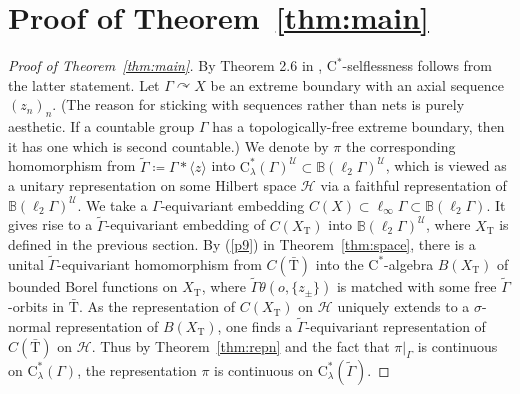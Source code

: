 \documentclass[12pt,nosumlimits,nonamelimits]{amsart}
\theoremstyle{remark}
\theoremstyle{definition}
\newcommand{\IB}{\mathbb{B}}
\newcommand{\cH}{\mathcal{H}}
\newcommand{\cU}{\mathcal{U}}
\newcommand{\Ga}{\Gamma}
\newcommand{\Tree}{\mathrm{T}}
\newcommand{\acts}{\curvearrowright}
\newcommand{\ip}[1]{\mathopen{\langle}#1\mathclose{\rangle}}
\begin{document}
%
\section{Proof of Theorem~\ref{thm:main}}
%
\begin{proof}[Proof of Theorem~\ref{thm:main}]
By Theorem 2.6 in \cite{robert}, $\mathrm{C}^*$-selflessness 
follows from the latter statement. 
Let $\Ga\acts X$ be an extreme boundary 
with an axial sequence $(z_n)_n$. 
(The reason for sticking with sequences 
rather than nets is purely aesthetic. 
If a countable group $\Ga$ has a topologically-free 
extreme boundary, then it has one which is second countable.)
%
%
We denote by $\pi$ the corresponding homomorphism 
from $\tilde{\Ga} \coloneq \Ga*\ip{z}$ into 
$\mathrm{C}^*_\lambda(\Ga)^\cU \subset \IB(\ell_2\Ga)^\cU$, 
which is viewed as a unitary representation on 
some Hilbert space $\cH$ 
via a faithful representation of $\IB(\ell_2\Ga)^\cU$. 
We take a $\Ga$-equivariant embedding 
$C(X)\subset\ell_\infty\Ga\subset\IB(\ell_2\Ga)$. 
It gives rise to a $\tilde{\Ga}$-equivariant embedding 
of $C(X_\Tree)$ into $\IB(\ell_2\Ga)^\cU$, 
where $X_\Tree$ is defined in the previous section. 
By (\ref{p9}) in Theorem~\ref{thm:space}, 
there is a unital $\tilde{\Ga}$-equivariant 
homomorphism from $C(\bar{\Tree})$ into 
the $\mathrm{C}^*$-alge\-bra $B(X_\Tree)$ 
of bounded Borel functions on $X_\Tree$, 
where $\tilde{\Ga}\theta(o,\{z_\pm\})$ is matched 
with some free $\tilde{\Ga}$-orbits in $\bar{\Tree}$. 
As the representation 
of $C(X_\Tree)$ on $\cH$ uniquely extends 
to a $\sigma$-normal representation of $B(X_\Tree)$, 
one finds a $\tilde{\Ga}$-equivariant representation of 
$C(\bar{\Tree})$ on $\cH$.  
Thus by Theorem~\ref{thm:repn} 
and the fact that $\pi|_\Ga$ is continuous 
on $\mathrm{C}^*_\lambda(\Ga)$, the representation 
$\pi$ is continuous on $\mathrm{C}^*_\lambda(\tilde{\Ga})$. 
\end{proof}
\end{document}
